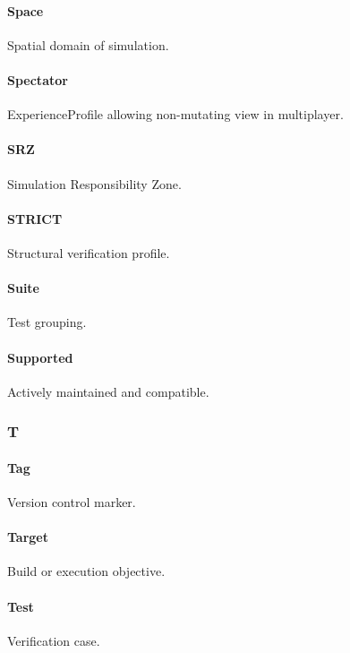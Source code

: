 \documentclass[9pt,a4paper,openany]{book}
\begin{document}
\paragraph{Space}
Spatial domain of simulation.\allowbreak{}


\paragraph{Spectator}
ExperienceProfile allowing non-\allowbreak{}mutating view in multiplayer.\allowbreak{}


\paragraph{SRZ}
Simulation Responsibility Zone.\allowbreak{}


\paragraph{STRICT}
Structural verification profile.\allowbreak{}


\paragraph{Suite}
Test grouping.\allowbreak{}


\paragraph{Supported}
Actively maintained and compatible.\allowbreak{}


\subsubsection{T}

\paragraph{Tag}
Version control marker.\allowbreak{}


\paragraph{Target}
Build or execution objective.\allowbreak{}


\paragraph{Test}
Verification case.\allowbreak{}
\end{document}
